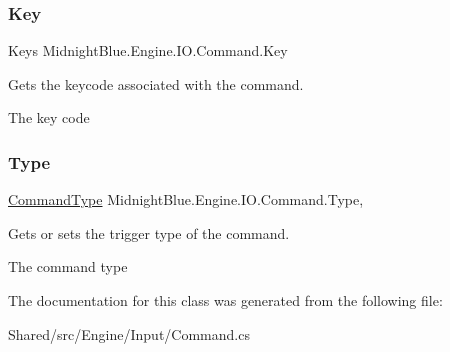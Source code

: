 \subsubsection{\texorpdfstring{Key}{Key}}
{\footnotesize\ttfamily Keys Midnight\+Blue.\+Engine.\+I\+O.\+Command.\+Key\hspace{0.3cm}{\ttfamily [get]}}



Gets the keycode associated with the command. 

The key code\hypertarget{class_midnight_blue_1_1_engine_1_1_i_o_1_1_command_ac423cb29bcb47794c22ad6f5b0847ee6}{}\label{class_midnight_blue_1_1_engine_1_1_i_o_1_1_command_ac423cb29bcb47794c22ad6f5b0847ee6} 
\subsubsection{\texorpdfstring{Type}{Type}}
{\footnotesize\ttfamily \hyperlink{namespace_midnight_blue_1_1_engine_1_1_i_o_a8bc3f159399ecadd590f7df1b54354b0}{Command\+Type} Midnight\+Blue.\+Engine.\+I\+O.\+Command.\+Type\hspace{0.3cm}{\ttfamily [get]}, {\ttfamily [set]}}



Gets or sets the trigger type of the command. 

The command type

The documentation for this class was generated from the following file\+:\begin{DoxyCompactItemize}
\item 
Shared/src/\+Engine/\+Input/Command.\+cs\end{DoxyCompactItemize}
